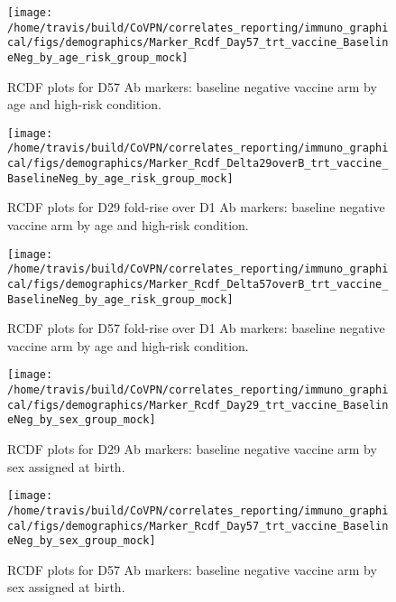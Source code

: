 \documentclass[]{book}
\theoremstyle{definition}
\theoremstyle{definition}
\theoremstyle{definition}
\newcommand{\1}{\mathbbm{1}}
\begin{document}
\begin{figure}[H]

{\centering \texttt{[image: /home/travis/build/CoVPN/correlates\_reporting/immuno\_graphical/figs/demographics/Marker\_Rcdf\_Day57\_trt\_vaccine\_BaselineNeg\_by\_age\_risk\_group\_mock]} 

}

\caption{RCDF plots for D57 Ab markers: baseline negative vaccine arm by age and high-risk condition.}\label{fig:unnamed-chunk-64}
\end{figure}

\begin{figure}[H]

{\centering \texttt{[image: /home/travis/build/CoVPN/correlates\_reporting/immuno\_graphical/figs/demographics/Marker\_Rcdf\_Delta29overB\_trt\_vaccine\_BaselineNeg\_by\_age\_risk\_group\_mock]} 

}

\caption{RCDF plots for D29 fold-rise over D1 Ab markers: baseline negative vaccine arm by age and high-risk condition.}\label{fig:unnamed-chunk-65}
\end{figure}

\begin{figure}[H]

{\centering \texttt{[image: /home/travis/build/CoVPN/correlates\_reporting/immuno\_graphical/figs/demographics/Marker\_Rcdf\_Delta57overB\_trt\_vaccine\_BaselineNeg\_by\_age\_risk\_group\_mock]} 

}

\caption{RCDF plots for D57 fold-rise over D1 Ab markers: baseline negative vaccine arm by age and high-risk condition.}\label{fig:unnamed-chunk-66}
\end{figure}

\begin{figure}[H]

{\centering \texttt{[image: /home/travis/build/CoVPN/correlates\_reporting/immuno\_graphical/figs/demographics/Marker\_Rcdf\_Day29\_trt\_vaccine\_BaselineNeg\_by\_sex\_group\_mock]} 

}

\caption{RCDF plots for D29 Ab markers: baseline negative vaccine arm by sex assigned at birth.}\label{fig:unnamed-chunk-67}
\end{figure}

\begin{figure}[H]

{\centering \texttt{[image: /home/travis/build/CoVPN/correlates\_reporting/immuno\_graphical/figs/demographics/Marker\_Rcdf\_Day57\_trt\_vaccine\_BaselineNeg\_by\_sex\_group\_mock]} 

}

\caption{RCDF plots for D57 Ab markers: baseline negative vaccine arm by sex assigned at birth.}\label{fig:unnamed-chunk-68}
\end{figure}
\end{document}
